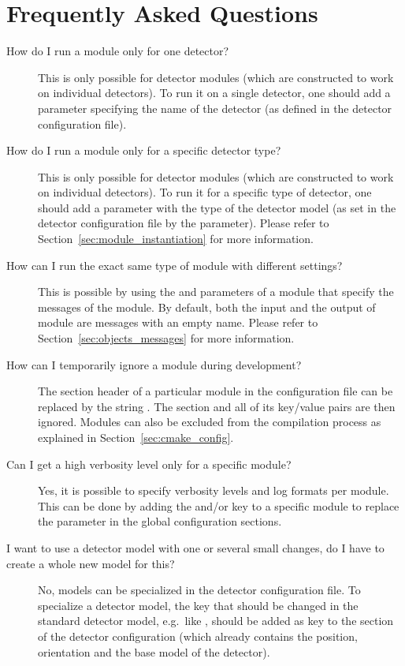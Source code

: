 \chapter{Frequently Asked Questions}
\label{ch:faq}

\begin{description}
\item[How do I run a module only for one detector?]
This is only possible for detector modules (which are constructed to work on individual detectors).
To run it on a single detector, one should add a parameter  specifying the name of the detector (as defined in the detector configuration file).
\item[How do I run a module only for a specific detector type?]
This is only possible for detector modules (which are constructed to work on individual detectors).
To run it for a specific type of detector, one should add a parameter  with the type of the detector model (as set in the detector configuration file by the  parameter).
Please refer to Section~\ref{sec:module_instantiation} for more information.
\item[How can I run the exact same type of module with different settings?] This is possible by using the  and  parameters of a module that specify the messages of the module.
By default, both the input and the output of module are messages with an empty name.
Please refer to Section~\ref{sec:objects_messages} for more information.
\item[How can I temporarily ignore a module during development?]
The section header of a particular module in the configuration file can be replaced by the string .
The section and all of its key/value pairs are then ignored.
Modules can also be excluded from the compilation process as explained in Section~\ref{sec:cmake_config}.
\item[Can I get a high verbosity level only for a specific module?]
Yes, it is possible to specify verbosity levels and log formats per module.
This can be done by adding the  and/or  key to a specific module to replace the parameter in the global configuration sections.
\item[I want to use a detector model with one or several small changes, do I have to create a whole new model for this?] No, models can be specialized in the detector configuration file.
To specialize a detector model, the key that should be changed in the standard detector model, e.g.\ like , should be added as key to the section of the detector configuration (which already contains the position, orientation and the base model of the detector).

\end{description}
